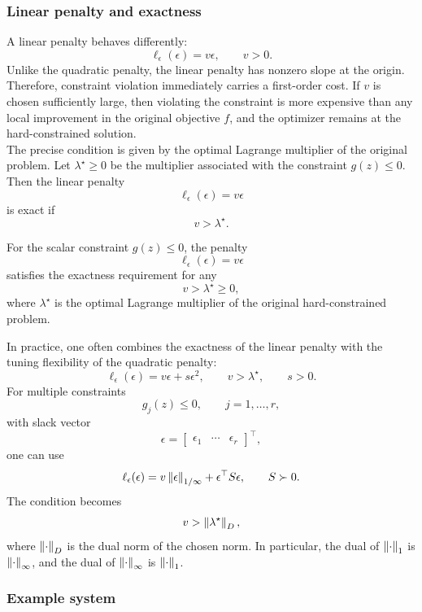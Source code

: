 \subsubsection{Linear penalty and exactness}

A linear penalty behaves differently:
\[
    \ell_\epsilon(\epsilon)=v\epsilon,
    \qquad v>0.
\]
Unlike the quadratic penalty, the linear penalty has nonzero slope at the origin. Therefore,
constraint violation immediately carries a first-order cost. If \(v\) is chosen sufficiently large,
then violating the constraint is more expensive than any local improvement in the original
objective \(f\), and the optimizer remains at the hard-constrained solution.\\
The precise condition is given by the optimal Lagrange multiplier of the original problem. Let
\(\lambda^\star\ge0\) be the multiplier associated with the constraint \(g(z)\le0\). Then the
linear penalty
\[
    \ell_\epsilon(\epsilon)=v\epsilon
\]
is exact if
\[
    v>\lambda^\star.
\]

\begin{theorembox}
For the scalar constraint \(g(z)\le0\), the penalty
\[
    \ell_\epsilon(\epsilon)=v\epsilon
\]
satisfies the exactness requirement for any
\[
    v>\lambda^\star\ge0,
\]
where \(\lambda^\star\) is the optimal Lagrange multiplier of the original hard-constrained
problem.
\end{theorembox}

In practice, one often combines the exactness of the linear penalty with the tuning flexibility of
the quadratic penalty:
\[
    \ell_\epsilon(\epsilon)=v\epsilon+s\epsilon^2,
    \qquad v>\lambda^\star,\qquad s>0.
\]
For multiple constraints
\[
    g_j(z)\le0,\qquad j=1,\dots,r,
\]
with slack vector
\[
    \epsilon =
    \begin{bmatrix}
        \epsilon_1 & \cdots & \epsilon_r
    \end{bmatrix}^\top,
\]
one can use
\[
    \ell_\epsilon(\epsilon)
    =
    v\left\lVert \epsilon \right\rVert_{1/\infty}
    +
    \epsilon^\top S\epsilon,
    \qquad S\succ0.
\]
The condition becomes
\[
    v>\left\lVert \lambda^\star \right\rVert_D,
\]
where \(\left\lVert \cdot \right\rVert_D\) is the dual norm of the chosen norm. In particular, the dual of
\(\left\lVert \cdot \right\rVert_1\) is \(\left\lVert \cdot \right\rVert_\infty\), and the dual of
\(\left\lVert \cdot \right\rVert_\infty\) is \(\left\lVert \cdot \right\rVert_1\).

\subsubsection{Example system}

